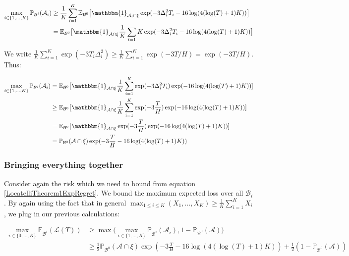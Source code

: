 \documentclass[12pt,]{article}
\begin{document}
\begin{align*}
\max_{i \in \{1,\dots,K\}} \mathbb{P}_{\mathcal{B}^i}(\mathcal{A}_i) & \geq \frac{1}{K} \sum_{i=1}^{K} \mathbb{E}_{\mathcal{B}^0} \big[\mathbbm{1}_{\mathcal{A}_i \cap \xi} \exp (- 3 \Delta_i^2 T_i - 16 \log(4(\log(T)+1)K)) \big] \\
& = \mathbb{E}_{\mathcal{B}^0} \big[\mathbbm{1}_{\mathcal{A} \cap \xi} \frac{1}{K} \sum_{i=1}{K} \exp (- 3 \Delta_i^2 T_i - 16 \log(4(\log(T)+1)K)) \big]
\end{align*}

We write
\(\frac{1}{K} \sum_{i=1}^K \exp(-3T_i \Delta_i^2) \geq \frac{1}{K} \sum_{i=1}^K \exp(-3 T/H) = \exp(-3 T/H)\).
Thus:

\begin{align*}
\max_{i \in \{1,\dots,K\}} \mathbb{P}_{\mathcal{B}^i}(\mathcal{A}_i) & = \mathbb{E}_{\mathcal{B}^0} \big[\mathbbm{1}_{\mathcal{A} \cap \xi} \frac{1}{K} \sum_{i=1}^{K} \exp (- 3 \Delta_i^2 T_i) \exp(-16 \log(4(\log(T)+1)K)) ] \\
& \geq \mathbb{E}_{\mathcal{B}^0} \big[\mathbbm{1}_{\mathcal{A} \cap \xi} \frac{1}{K} \sum_{i=1}^{K} \exp (- 3 \frac{T}{H}) \exp(-16 \log(4(\log(T)+1)K)) ] \\
& = \mathbb{E}_{\mathcal{B}^0} \big[\mathbbm{1}_{\mathcal{A} \cap \xi} \exp (- 3 \frac{T}{H}) \exp(-16 \log(4(\log(T)+1)K)) ] \\
& = \mathbb{P}_{\mathcal{B}^0} (\mathcal{A} \cap \xi) \exp (- 3 \frac{T}{H} -16 \log(4(\log(T)+1)K))
\end{align*}

\subsubsection{Bringing everything
together}\label{bringing-everything-together}

Consider again the risk which we need to bound from equation
\eqref{LocatelliTheorem1ExpRegret}. We bound the maximum expected loss
over all \(\mathcal{B}_i\). By again using the fact that in general
\(\max_{1 \leq i \leq K} (X_1, \dots, X_K) \geq \frac{1}{K} \sum_{i = 1}^K X_i\),
we plug in our previous calculations:

\begin{align}
\max_{i \in \{0, \dots, K\}} \mathbb{E}_{\mathcal{B}^i} (\mathcal{L}(T)) & \geq \max \big( \max_{i \in \{1, \dots, K\}} \mathbb{P}_{\mathcal{B}^i}(\mathcal{A}_i), 1 - \mathbb{P}_{\mathcal{B}^0}(\mathcal{A}) \big) \\
& \geq \frac{1}{2}\mathbb{P}_{\mathcal{B}^0} (\mathcal{A} \cap \xi) \exp (- 3 \frac{T}{H} -16 \log(4(\log(T)+1)K)) + \frac{1}{2}(1 - \mathbb{P}_{\mathcal{B}^0}(\mathcal{A})) \label{LocatelliTheorem1DefinitionOfRisk}
\end{align}
\end{document}
